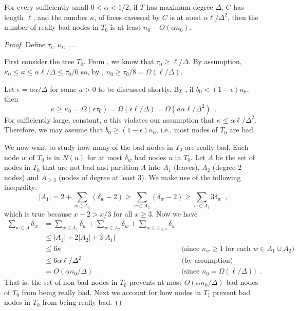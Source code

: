 \documentclass{patmorin}
\begin{document}
\begin{lem}
  For every sufficiently small $0<\alpha < 1/2$,  
  if $T$ has maximum degree $\Delta$, $C$ has length $\ell$, and the number
  $\kappa$, of faces caressed by $C$ is at most $\alpha\ell/\Delta^2$, then
  the number of really bad nodes in $T_0$ is at least $n_0-O(\alpha n_0)$.
\end{lem}

\begin{proof}
  Define $\tau_i$, $\kappa_i$, ....

  First consider the tree $T_0$.  From ,
  we know that $\tau_0\ge \ell/\Delta$.  By assumption,
  $\kappa_0\le\kappa\le \alpha\ell/\Delta \le \tau_0/6$
  so, by , $n_0 \ge
  \tau_0/8=\Omega(\ell/\Delta)$.
  
  Let $\epsilon=a\alpha/\Delta$ for some $a>0$ to be discussed shortly.
  By , if $b_0 < (1-\epsilon) n_0$, then
  \[ 
      \kappa \ge \kappa_0 = \Omega(\epsilon\tau_0)
               = \Omega(\epsilon\ell/\Delta)
               = \Omega(a\alpha\ell/\Delta^2) 
               \enspace .
  \]
  For sufficiently large, constant, $a$ this violates our assumption
  that $\kappa \le \alpha\ell/\Delta^2$.
  Therefore, we may assume that $b_0\ge (1-\epsilon)n_0$, i.e., most nodes
  of $T_0$ are bad.

  We now want to study how many of the bad nodes in $T_0$ are really bad.
  Each node $w$ of $T_0$ is in $N(u)$ for at most $\delta_w$ bad nodes
  $u$ in $T_0$.  Let $A$ be the set of nodes in $T_0$ that are not
  bad and partition $A$ into $A_1$ (leaves), $A_2$ (degree-2 nodes)
  and $A_{\ge 3}$ (nodes of degree at least 3).  We make use of the
  following inequality:
  \[  |A_1| = 2 + \sum_{w\in A_3}(\delta_w-2) \ge \sum_{w\in A_3}(\delta_w-2)
    \ge \sum_{w\in A_3}3\delta_w \enspace , \] 
  which is true because $x-2>x/3$ for all $x\ge 3$. 
  Now we have 
  \begin{align*}
   \sum_{w\in A}\delta_w 
    & = \sum_{w\in A_1}\delta_w 
         + \sum_{w\in A_2}\delta_w 
         + \sum_{w\in A_{\ge 3}}\delta_w \\
    & \le |A_1| + 2|A_2| + 3|A_1| \\
    & \le 6\kappa & \text{(since $\kappa_w\ge 1$ for each $w\in A_1\cup A_2$)}\\
    & \le 6\alpha\ell/\Delta^2 & \text{(by assumption)}\\
    & = O(\alpha n_0/\Delta) & \text{(since $n_0=\Omega(\ell/\Delta)$)}\enspace .
  \end{align*}
  That is, the set of non-bad nodes in $T_0$ prevents at most $O(\alpha
  n_0/\Delta)$ bad nodes of $T_0$ from being really bad. Next we account
  for how nodes in $T_1$ prevent bad nodes in $T_0$ from being really bad.


\end{proof}
\end{document}
